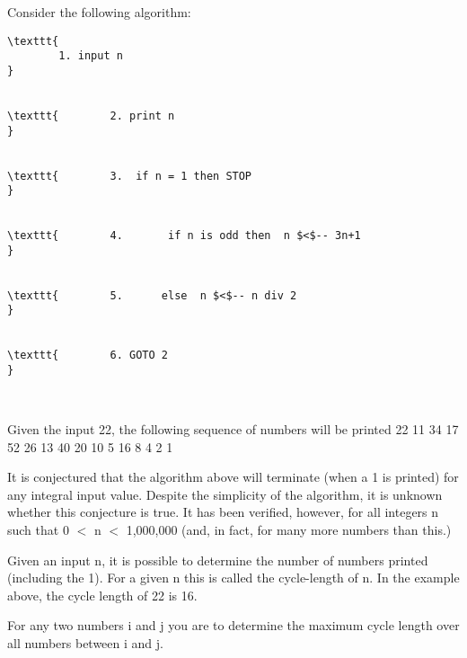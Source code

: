 Consider the following algorithm:
\begin{verbatim}
\texttt{
		1. input n
}


\texttt{		2. print n
}


\texttt{		3. 	if n = 1 then STOP
}


\texttt{		4. 	     if n is odd then  n $<$-- 3n+1 
}


\texttt{		5. 		else  n $<$-- n div 2 
}


\texttt{		6. GOTO 2
}

 \end{verbatim}

Given the input 22, the following sequence of numbers will be printed 22 11  34 17 52 26 13 40 20 10 5 16 8 4 2 1

It is conjectured that the algorithm above will terminate (when a 1 is printed) for any integral input value. Despite the simplicity of the algorithm, it is unknown whether this conjecture is true. It has been verified, however, for all integers n such that 0 $<$ n $<$ 1,000,000 (and, in  fact, for many more numbers than this.)

Given an input n, it is possible to determine the number of numbers  printed (including the 1). For a given n this is called the  cycle-length of n. In the example above, the cycle length of 22  is 16.

For any two numbers i and j you are to determine the maximum  cycle length over all numbers between i and j.